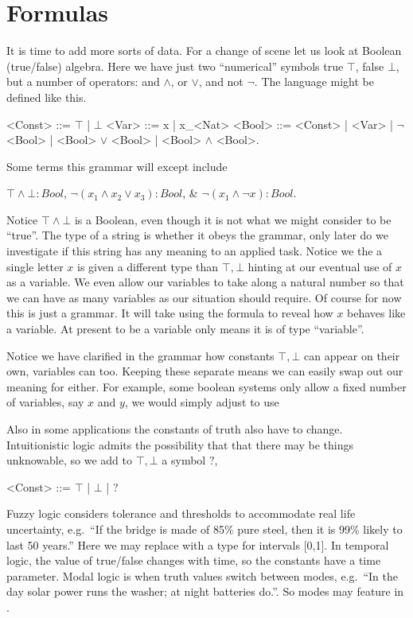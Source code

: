 \section{Formulas}
It is time to add more sorts of data.  For a change of scene let us look 
at Boolean (true/false) algebra.  Here we have just two ``numerical''
symbols true $\top$,
false $\bot$, but a number of operators: and $\wedge$, or $\vee$, and not $\neg$.
The language might be defined
like this.
\begin{Gcode}[]
<Const> ::= $\top$  | $\bot$
<Var>  ::= x | x_<Nat>
<Bool> ::= <Const>
        | <Var>
        | $\neg$ <Bool> 
        | <Bool> $\vee$ <Bool> 
        | <Bool> $\wedge$ <Bool>.
\end{Gcode}
Some terms this grammar will except include 
\begin{center}
    $\top \wedge \bot :Bool$, 
    $\neg (x_1\wedge x_2\vee x_3):Bool$, \&
    $\neg(x_1\wedge \neg x):Bool$.
\end{center}
Notice $\top\wedge \bot$ is a Boolean, even though it is not what we might 
consider to be ``true''.   The type of a string is whether it obeys the grammar,
only later do we investigate if this string has any meaning to an applied task.
Notice we the a single letter $x$ is given a different type than $\top,\bot$
hinting at our eventual use of $x$ as a variable.  We even allow our variables 
to take along a natural number so that we can have as many variables as our situation 
should require.  Of course for now this is just a grammar.  It will take using 
the formula to reveal how $x$ behaves like a variable.  At present to be 
a variable only means it is of type ``variable''.



Notice we have clarified in the grammar how 
constants $\top,\bot$ can appear on their own, variables can too.  
Keeping these separate means we can easily swap out our meaning for either.
For example, some boolean systems only allow a fixed number of variables, say 
$x$ and $y$, we would simply adjust to use 
\begin{center}
\end{center}
Also in some applications the constants of truth also have to change.
Intuitionistic logic admits the possibility that that there may be 
things unknowable, so we add to $\top,\bot$ a symbol $?$,
\begin{center}
\begin{Gcode}[]
<Const> ::= $\top$ | $\bot$ | ?
\end{Gcode}
\end{center}
Fuzzy logic considers tolerance and thresholds to accommodate real life uncertainty, 
e.g.\ ``If the bridge is made of 85\% pure steel, then it is 99\% likely to last 50 years.''
Here we may replace  with a type for intervals [0,1].
In temporal logic, the value of true/false changes with time, so the 
constants have a time parameter.  Modal logic is when truth values 
switch between modes, e.g.\ ``In the day solar power runs the washer; at night 
batteries do.''.  So modes may feature in .


